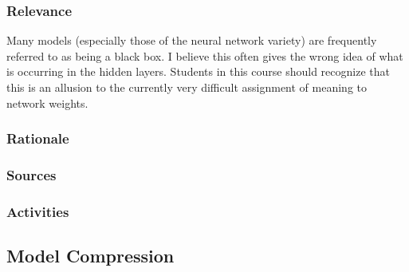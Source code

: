 \documentclass[12pt]{amsart}
\begin{document}
\subsubsection{Relevance}
Many models (especially those of the neural network variety) are frequently referred to as being a black box. 
I believe this often gives the wrong idea of what is occurring in the hidden layers.
Students in this course should recognize that this is an allusion to the currently very difficult 
assignment of meaning to network weights.

\subsubsection{Rationale}


\subsubsection{Sources}
\subsubsection{Activities}
 

\subsection{Model Compression}
\end{document}
